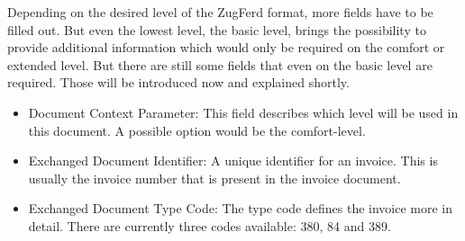 Depending on the desired level of the ZugFerd format, more fields have to be filled out. But even the lowest level, the basic level, brings the possibility to provide additional information which would only be required on the comfort or extended level. But there are still some fields that even on the basic level are required. Those will be introduced now and explained shortly.
\begin{itemize}
	\item Document Context Parameter: This field describes which level will be used in this document. A possible option would be the comfort-level.
	\item Exchanged Document Identifier: A unique identifier for an invoice. This is usually the invoice number that is present in the invoice document.
	\item Exchanged Document Type Code: The type code defines the invoice more in detail. There are currently three codes available: 380, 84 and 389.
	

\end{itemize}
